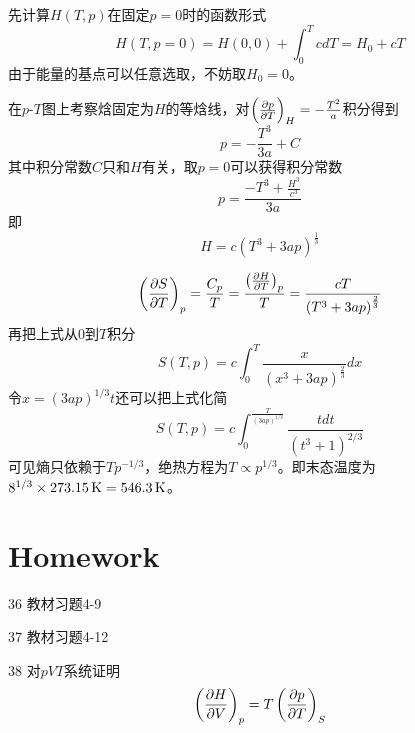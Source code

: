 \documentclass[CJK]{beamer}
\begin{document}
\begin{frame}
  \bch
  {\small
    先计算$H(T, p)$在固定$p=0$时的函数形式
    $$H(T, p=0) = H(0, 0)+\int_0^T c dT = H_0+cT$$
    由于能量的基点可以任意选取，不妨取$H_0=0$。
  
    在$p$-$T$图上考察焓固定为$H$的等焓线，对$\left(\frac{\partial p}{\partial T}\right)_{H} = -\frac{T^2}{a}$积分得到
    $$ p = -\frac{T^3}{3a} + C $$
    其中积分常数$C$只和$H$有关，取$p=0$可以获得积分常数
    $$ p = \frac{-T^3 + \frac{H^3}{c^3}}{3a} $$
    即
    $$H = c\left(T^3 + 3ap\right)^{\frac{1}{3}} $$
  }
  \ech
\end{frame}

\begin{frame}
  \bch
  {\small
    $$ \left(\frac{\partial S}{\partial T}\right)_{p} = \frac{C_p}{T}= \frac{\left(\frac{\partial H}{\partial T}\right)_{p}}{T}  = \frac{cT}{\left(T^3 +3ap \right)^{\frac{2}{3}}} $$
    再把上式从$0$到$T$积分
    $$ S(T, p) = c \int_0^T  \frac{x}{\left(x^3 +3ap \right)^{\frac{2}{3}}} dx$$
    令$x = (3ap)^{1/3}t$还可以把上式化简
    $$S(T, p) = c \int_0^{\frac{T}{(3ap)^{1/3}}} \frac{tdt}{\left(t^3+1\right)^{2/3}} $$
    可见熵只依赖于$Tp^{-1/3}$，绝热方程为$T\propto p^{1/3}$。即末态温度为$8^{1/3}\times 273.15\,\mathrm{K} = 546.3\,\mathrm{K}$。
}
  \ech
\end{frame}




\section{Homework}

\begin{frame}
  \bch
  \bitem
\item[36]{教材习题4-9}
\item[37]{教材习题4-12}
\item[38]{对$pVT$系统证明  $$\left(\frac{\partial H}{\partial V}\right)_{p} = T\left(\frac{\partial p}{\partial T}\right)_{S} $$}
\eitem
  
  \ech
\end{frame}
\end{document}
